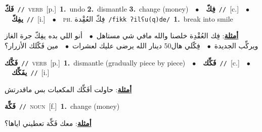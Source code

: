 \documentclass[10pt,a4paper,twoside]{article} %
\begin{document}
\begin{multicols}{2}
{\setlength\topsep{0pt}\textbf{\foreignlanguage{arabic}{فَكّ}}\ {\color{gray}\texttt{//}\color{black}}\ \textsc{verb}\ [p.]\ \textbf{1.}~undo  \textbf{2.}~dismantle  \textbf{3.}~change (money)\ \ $\bullet$\ \ \setlength\topsep{0pt}\textbf{\foreignlanguage{arabic}{فِكّ}}\ {\color{gray}\texttt{//}\color{black}}\ [c.]\ \ $\bullet$\ \ \setlength\topsep{0pt}\textbf{\foreignlanguage{arabic}{يفِكّ}}\ {\color{gray}\texttt{//}\color{black}}\ [i.]\ \ $\bullet$\ \ \textsc{ph.} \color{gray} \foreignlanguage{arabic}{فِكّ العُقِْدة}\color{black}\ {\color{gray}\texttt{/{\sffamily fikk ʔilʕu(q)de}/}\color{black}}\ \textbf{1.}~break into smile\  \begin{flushright}\color{gray}\foreignlanguage{arabic}{\textbf{\underline{\foreignlanguage{arabic}{أمثلة}}}: فِك العُقْدِة خلصنا والله مافي شي مستاهل\ $\bullet$\ \  أنو اللي بده يفِكّ جرة الغاز ويركِّب الجديدة\ $\bullet$\ \  فِكّلي هال50 دينار الله يرضى عليك لعشرات\ $\bullet$\ \  مين فَكّلك الأزرار؟}\end{flushright}\color{black}} \vspace{2mm}

{\setlength\topsep{0pt}\textbf{\foreignlanguage{arabic}{فَكَّك}}\ {\color{gray}\texttt{//}\color{black}}\ \textsc{verb}\ [p.]\ \textbf{1.}~dismantle (gradually piece by piece)\ \ $\bullet$\ \ \setlength\topsep{0pt}\textbf{\foreignlanguage{arabic}{فَكِّك}}\ {\color{gray}\texttt{//}\color{black}}\ [c.]\ \ $\bullet$\ \ \setlength\topsep{0pt}\textbf{\foreignlanguage{arabic}{يفَكِّك}}\ {\color{gray}\texttt{//}\color{black}}\ [i.]\  \begin{flushright}\color{gray}\foreignlanguage{arabic}{\textbf{\underline{\foreignlanguage{arabic}{أمثلة}}}: حاولت أفَكِّك المكعبات بس ماقدرتش}\end{flushright}\color{black}} \vspace{2mm}

{\setlength\topsep{0pt}\textbf{\foreignlanguage{arabic}{فَكِّة}}\ {\color{gray}\texttt{//}\color{black}}\ \textsc{noun}\ [f.]\ \textbf{1.}~change (money)\  \begin{flushright}\color{gray}\foreignlanguage{arabic}{\textbf{\underline{\foreignlanguage{arabic}{أمثلة}}}: معك فَكِّة تعطيني اياها؟}\end{flushright}\color{black}} \vspace{2mm}


\end{multicols}
\end{document}
